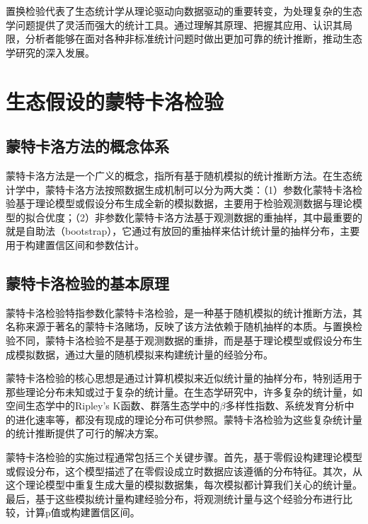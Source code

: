 \documentclass[
  twoside,12pt,fontset=none]{ctexbook}
\begin{document}
置换检验代表了生态统计学从理论驱动向数据驱动的重要转变，为处理复杂的生态学问题提供了灵活而强大的统计工具。通过理解其原理、把握其应用、认识其局限，分析者能够在面对各种非标准统计问题时做出更加可靠的统计推断，推动生态学研究的深入发展。

\hypertarget{ux751fux6001ux5047ux8bbeux7684ux8499ux7279ux5361ux6d1bux68c0ux9a8c}{%
\section{生态假设的蒙特卡洛检验}\label{ux751fux6001ux5047ux8bbeux7684ux8499ux7279ux5361ux6d1bux68c0ux9a8c}}

\hypertarget{ux8499ux7279ux5361ux6d1bux65b9ux6cd5ux7684ux6982ux5ff5ux4f53ux7cfb}{%
\subsection{蒙特卡洛方法的概念体系}\label{ux8499ux7279ux5361ux6d1bux65b9ux6cd5ux7684ux6982ux5ff5ux4f53ux7cfb}}

蒙特卡洛方法是一个广义的概念，指所有基于随机模拟的统计推断方法。在生态统计学中，蒙特卡洛方法按照数据生成机制可以分为两大类：（1）参数化蒙特卡洛检验基于理论模型或假设分布生成全新的模拟数据，主要用于检验观测数据与理论模型的拟合优度；（2）非参数化蒙特卡洛方法基于观测数据的重抽样，其中最重要的就是自助法（bootstrap），它通过有放回的重抽样来估计统计量的抽样分布，主要用于构建置信区间和参数估计。

\hypertarget{ux8499ux7279ux5361ux6d1bux68c0ux9a8cux7684ux57faux672cux539fux7406}{%
\subsection{蒙特卡洛检验的基本原理}\label{ux8499ux7279ux5361ux6d1bux68c0ux9a8cux7684ux57faux672cux539fux7406}}

蒙特卡洛检验特指参数化蒙特卡洛检验，是一种基于随机模拟的统计推断方法，其名称来源于著名的蒙特卡洛赌场，反映了该方法依赖于随机抽样的本质。与置换检验不同，蒙特卡洛检验不是基于观测数据的重排，而是基于理论模型或假设分布生成模拟数据，通过大量的随机模拟来构建统计量的经验分布。

蒙特卡洛检验的核心思想是通过计算机模拟来近似统计量的抽样分布，特别适用于那些理论分布未知或过于复杂的统计量。在生态学研究中，许多复杂的统计量，如空间生态学中的Ripley's K函数、群落生态学中的\(\beta\)多样性指数、系统发育分析中的进化速率等，都没有现成的理论分布可供参照。蒙特卡洛检验为这些复杂统计量的统计推断提供了可行的解决方案。

蒙特卡洛检验的实施过程通常包括三个关键步骤。首先，基于零假设构建理论模型或假设分布，这个模型描述了在零假设成立时数据应该遵循的分布特征。其次，从这个理论模型中重复生成大量的模拟数据集，每次模拟都计算我们关心的统计量。最后，基于这些模拟统计量构建经验分布，将观测统计量与这个经验分布进行比较，计算p值或构建置信区间。
\end{document}
